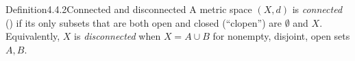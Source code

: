 \documentclass[main.tex]{subfiles}
\begin{document}
\begin{Obj}{Definition}{4.4.2}{Connected and disconnected}
A metric space $(X,d)$ is \emph{connected} () if its only subsets that are both open and closed
(``clopen'') are $\emptyset$ and $X$. Equivalently, $X$ is \emph{disconnected} when $X=A\cup B$ for
nonempty, disjoint, open sets $A,B$.
\end{Obj}

\ifSubfilesClassLoaded{\clearpage\objindex}{}
\end{document}
